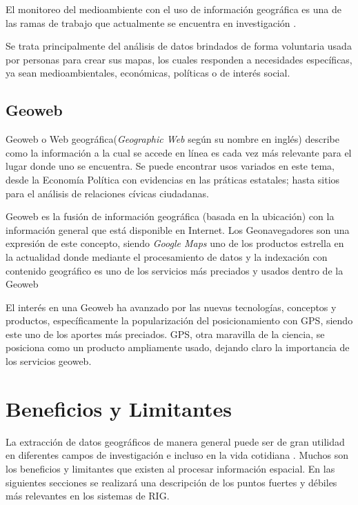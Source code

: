 \documentclass{llncs}
\begin{document}
El monitoreo del medioambiente con el uso de información geográfica es una de
las ramas de trabajo que actualmente se encuentra en investigación
\cite{connors2012}. 

Se trata principalmente del análisis de datos brindados de forma voluntaria
usada por personas para crear sus mapas, los cuales responden a necesidades
específicas, ya sean medioambientales, económicas, políticas o de interés
social. \cite{harris2012}

\subsection{Geoweb}\label{sec:geoweb}

Geoweb o Web geográfica(\emph{Geographic Web} según su nombre en inglés)
describe como la información a la cual se accede en línea es cada vez más
relevante para el lugar donde uno se encuentra. Se puede encontrar usos
variados en este tema, desde la Economía Política con evidencias en las
práticas estatales\cite{leszczynski2012}; hasta sitios para el análisis
de relaciones cívicas ciudadanas\cite{johnson2015}.

Geoweb es la fusión de información geográfica (basada en la ubicación) con la
información general que está disponible en Internet. Los Geonavegadores son
una expresión de este concepto, siendo \emph{Google Maps} uno de los productos
estrella en la actualidad donde mediante el procesamiento de datos y la
indexación con contenido geográfico es uno de los servicios más preciados y
usados dentro de la Geoweb

El interés en una Geoweb ha avanzado por las nuevas tecnologías,
conceptos y productos, específicamente la popularización del posicionamiento
con GPS, siendo este uno de los aportes más preciados. GPS, otra maravilla de
la ciencia, se posiciona como un producto ampliamente usado, dejando claro la
importancia de los servicios geoweb.

\section{Beneficios y Limitantes}\label{sec:pros-and-cons}

La extracción de datos geográficos de manera general puede ser de gran utilidad
en diferentes campos de investigación e incluso en la vida cotidiana
\cite{artz2009}. Muchos son los beneficios y limitantes que existen al procesar
información espacial. En las siguientes secciones se realizará una descripción
de los puntos fuertes y débiles más relevantes en los sistemas de RIG.
\end{document}
